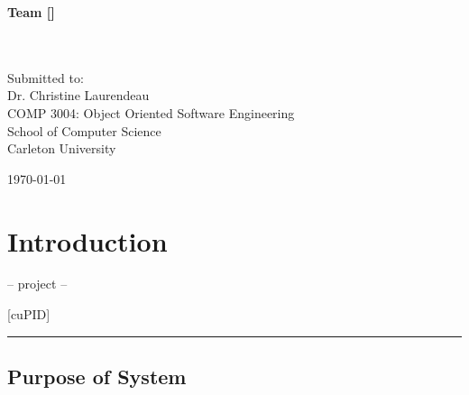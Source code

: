 \documentclass[12pt,letterpaper]{article}
\begin{document}
\vspace{5em}

\begin{center}
	\textbf{Team [\teamname{}]}\\
	\personone{}\\
	\persontwo{}\\
	\personthree{}
\end{center}

\vfill

\begin{center}
	Submitted to:\\
	Dr. Christine Laurendeau\\
	COMP 3004: Object Oriented Software Engineering\\
	School of Computer Science\\
	Carleton University
\end{center}

\vspace{2em}

\begin{center}
	\today
\end{center}

\newpage{}

\tableofcontents{}

\renewcommand{\listfigurename}{Figures}
\listoffigures

\renewcommand{\listtablename}{Tables}
\listoftables

\newpage{}

\section{Introduction}

\begin{center}
    -- project --
\end{center}

\begin{center}
	\Huge [cuPID]
\end{center}

\begin{center}
    \rule{0.85\textwidth}{0.5pt}
\end{center}

\subsection{Purpose of System}
\end{document}
